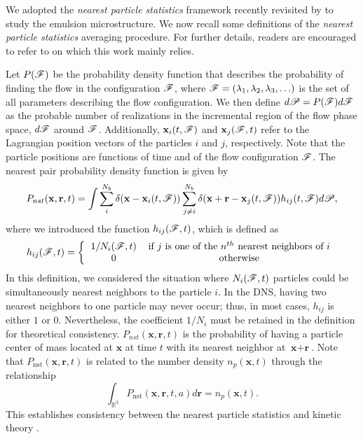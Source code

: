 
We adopted the \textit{nearest particle statistics} framework recently revisited by \citet{zhang2021ensemble} to study the emulsion microstructure.
We now recall some definitions of the \textit{nearest particle statistics} averaging procedure. 
For further details, readers are encouraged to refer to \citet{zhang2021ensemble,zhang2023evolution} on which this work mainly relies.

Let $P(\mathscr{F})$ be the probability density function that describes the probability of finding the flow in the configuration $\mathscr{F}$, where $\mathscr{F} = (\lambda_1,\lambda_2,\lambda_3,\ldots)$ is the set of all parameters describing the flow configuration.
We then define $d\mathscr{P} = P(\mathscr{F})d\mathscr{F}$ as the probable number of realizations in the incremental region of the flow phase space, $d\mathscr{F}$ around $\mathscr{F}$.
Additionally,  $\textbf{x}_i(t,\mathscr{F})$ and $\textbf{x}_j(\mathscr{F},t)$ refer to the Lagrangian position vectors of the particles $i$ and $j$, respectively. 
Note that the particle positions are functions of time and of the flow configuration $\mathscr{F}$. 
The nearest pair probability density function is given by \citep{zhang2021ensemble,zhang2023evolution}
\begin{equation}
    P_{nst}(\textbf{x},\textbf{r},t)= 
    \int \sum_{i}^{N_b}\delta(\textbf{x}-\textbf{x}_i(t,\mathscr{F}))
    \sum_{j\neq i}^{N_b}\delta(\textbf{x}+\textbf{r}-\textbf{x}_j(t,\mathscr{F})) 
    h_{ij} (t,\mathscr{F})
    d\mathscr{P},
    \label{eq:P_nstij}
\end{equation}
where we introduced the function $h_{ij}(\mathscr{F},t)$, which is defined as
\begin{equation*}
    h_{ij}(\FF,t)
    = \left\{
        \begin{tabular}{cc}
            $1/N_i(\FF,t)$ & if $j$ is one of the $n^{th}$ nearest neighbors of $i$ \\
            0& otherwise
        \end{tabular}
        \right.
\end{equation*}
In this definition, we considered the situation where $N_i(\mathscr{F},t)$ particles could be simultaneously nearest neighbors to the particle $i$. 
In the DNS, having two nearest neighbors to one particle may never occur; thus, in most cases, $h_{ij}$ is either $1$ or $0$. 
Nevertheless, the coefficient $1/N_i$ must be retained in the definition for theoretical consistency.
$P_{nst}(\textbf{x},\textbf{r},t)$ is the probability of having a particle center of mass located at $\textbf{x}$ at time $t$ with its nearest neighbor at $\textbf{x}+\textbf{r}$. 
Note that $P_\text{nst}(\textbf{x},\textbf{r},t)$ is related to the number density $n_p(\textbf{x},t)$ through the relationship
\begin{equation*}
    \int_{\mathbb{R}^3}
     P_\text{nst}(\textbf{x},\textbf{r},t,a) d\textbf{r}  = n_p(\textbf{x},t). 
    \label{eq:Pnst}
\end{equation*}
This establishes consistency between the nearest particle statistics and kinetic theory \citep{zhang2021ensemble}. 



